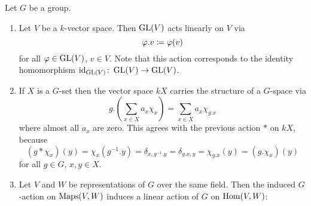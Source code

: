 \begin{example}
  Let $G$ be a group.
  \begin{enumerate}[label=\alph*)]
    \item
      Let $V$ be a $k$-vector space.
      Then $\operatorname{GL}(V)$ acts linearly on $V$ via
      \[
                  \varphi.v
        \coloneqq  \varphi(v)
      \]
      for all $\varphi \in \operatorname{GL}(V)$, $v \in V$.
      Note that this action corresponds to the identity homomorphism $\operatorname{id}_{\operatorname{GL}(V)} \colon \operatorname{GL}(V) \to \operatorname{GL}(V)$.
    \item
      If $X$ is a $G$-set then the vector space $kX$ carries the structure of a $G$-space via
      \[
          g.\left(\sum_{x \in X} a_x \chi_x\right)
        = \sum_{x \in X} a_x \chi_{g.x}
      \]
      where almost all $a_x$ are zero.
      This agrees with the previous action $*$ on $kX$, because
      \[
          (g * \chi_x)(y)
        = \chi_x(g^{-1}.y)
        = \delta_{x, g^{-1}.y}
        = \delta_{g.x, y}
        = \chi_{g.x}(y)
        = (g.\chi_x)(y)
      \]
      for all $g \in G$, $x, y \in X$.
    \item
      Let $V$ and $W$ be representations of $G$ over the same field.
      Then the induced $G$-action on $\operatorname{Maps}(V,W)$ induces a linear action of $G$ on $\operatorname{Hom}(V,W)$:
      

\end{enumerate}
\end{example}
